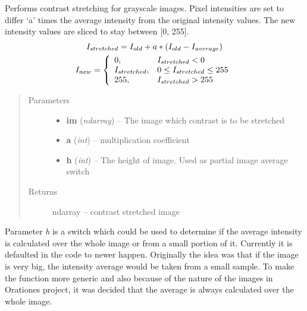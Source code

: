 \documentclass[letterpaper,10pt,english]{sphinxmanual}
\begin{document}
\begin{fulllineitems}
\begin{fulllineitems}
\label{code:osearch.OratUtils.contStretch}
Performs contrast stretching for grayscale images. Pixel intensities are set to 
differ `a' times the average intensity from the original intensity values. The new 
intensity values are sliced to stay between {[}0, 255{]}.
\begin{gather}
\begin{split}I_{stretched} = I_{old} + a*( I_{old} - I_{average} )\end{split}\notag\\\begin{split}I_{new} =
\left\{
\begin{array}[l]{ll}
  0, & I_{stretched} < 0 \\
  I_{stretched}, & 0 \leq I_{stretched} \leq 255\\
  255, & I_{stretched} > 255
\end{array}
\right.\end{split}\notag
\end{gather}\begin{quote}\begin{description}
\item[{Parameters}] \leavevmode\begin{itemize}
\item {} 
\textbf{im} (\emph{ndarray}) -- The image which contrast is to be stretched

\item {} 
\textbf{a} (\emph{int}) -- multiplication coefficient

\item {} 
\textbf{h} (\emph{int}) -- The height of image. Used as partial image average switch

\end{itemize}

\item[{Returns}] \leavevmode
ndarray -- contrast stretched image

\end{description}\end{quote}

Parameter \emph{h} is a switch which could be used to determine if the average intensity 
is calculated over the whole image or from a small portion of it. Currently it is 
defaulted in the code to newer happen. Originally the idea was that if the image 
is very big, the intensity average would be taken from a small sample. To make the 
function more generic and also because of the nature of the images in Orationes 
project, it was decided that the average is always calculated over the whole image.


\end{fulllineitems}
\end{fulllineitems}
\end{document}

